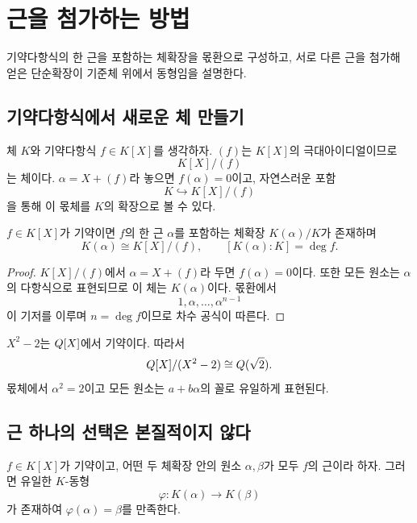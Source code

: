 \section{근을 첨가하는 방법}
\label{sec:root-adjunction}

\begin{learninggoal}
기약다항식의 한 근을 포함하는 체확장을 몫환으로 구성하고, 서로 다른 근을 첨가해 얻은 단순확장이 기준체 위에서 동형임을 설명한다.
\end{learninggoal}

\subsection{기약다항식에서 새로운 체 만들기}

체 $K$와 기약다항식 $f\in K[X]$를 생각하자. $(f)$는 $K[X]$의 극대아이디얼이므로
\[
  K[X]/(f)
\]
는 체이다. $\alpha=X+(f)$라 놓으면 $f(\alpha)=0$이고, 자연스러운 포함
\[
  K\hookrightarrow K[X]/(f)
\]
을 통해 이 몫체를 $K$의 확장으로 볼 수 있다.

\begin{theorem}[근의 첨가]
$f\in K[X]$가 기약이면 $f$의 한 근 $\alpha$를 포함하는 체확장 $K(\alpha)/K$가 존재하며
\[
  K(\alpha)\cong K[X]/(f),
  \qquad [K(\alpha):K]=\deg f.
\]
\end{theorem}

\begin{proof}
$K[X]/(f)$에서 $\alpha=X+(f)$라 두면 $f(\alpha)=0$이다. 또한 모든 원소는 $\alpha$의 다항식으로 표현되므로 이 체는 $K(\alpha)$이다. 몫환에서
\[
  1,\alpha,\dots,\alpha^{n-1}
\]
이 기저를 이루며 $n=\deg f$이므로 차수 공식이 따른다.
\end{proof}

\begin{example}
$X^2-2$는 $Q[X]$에서 기약이다. 따라서
\[
  Q[X]/(X^2-2)\cong Q(\sqrt2).
\]
몫체에서 $\alpha^2=2$이고 모든 원소는 $a+b\alpha$의 꼴로 유일하게 표현된다.
\end{example}

\subsection{근 하나의 선택은 본질적이지 않다}

\begin{theorem}[근을 보내는 동형]
$f\in K[X]$가 기약이고, 어떤 두 체확장 안의 원소 $\alpha,\beta$가 모두 $f$의 근이라 하자. 그러면 유일한 $K$-동형
\[
  \varphi:K(\alpha)\longrightarrow K(\beta)
\]
가 존재하여 $\varphi(\alpha)=\beta$를 만족한다.
\end{theorem}

